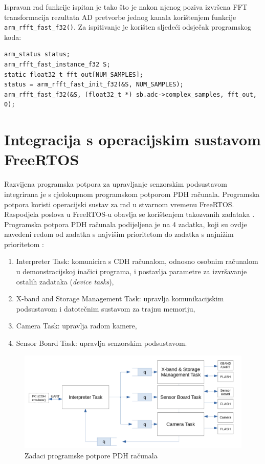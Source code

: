 Ispravan rad funkcije ispitan je tako što je nakon njenog poziva izvršena FFT transformacija rezultata AD pretvorbe jednog kanala korištenjem funkcije \texttt{arm\_rfft\_fast\_f32()}. Za ispitivanje je korišten sljedeći odsječak programskog koda:

\begin{lstlisting}[caption={Program za računanje FFT spektra signala}]
arm_status status;
arm_rfft_fast_instance_f32 S;
static float32_t fft_out[NUM_SAMPLES];
status = arm_rfft_fast_init_f32(&S, NUM_SAMPLES);
arm_rfft_fast_f32(&S, (float32_t *) sb.adc->complex_samples, fft_out, 0);
\end{lstlisting}

\section{Integracija s operacijskim sustavom FreeRTOS}

Razvijena programska potpora za upravljanje senzorskim podsustavom integrirana je s cjelokupnom programskom potporom PDH računala. Programska potpora koristi operacijski sustav za rad u stvarnom vremenu FreeRTOS. Raspodjela poslova u FreeRTOS-u obavlja se korištenjem takozvanih zadataka . Programska potpora PDH računala podijeljena je na 4 zadatka, koji su ovdje navedeni redom od zadatka s najvišim prioritetom do zadatka s najnižim prioritetom \cite{diplomski_goran_petrak}:

\begin{enumerate}
    \item Interpreter Task: komunicira s CDH računalom, odnosno osobnim računalom u demonstracijskoj inačici programa, i postavlja parametre za izvršavanje ostalih zadataka (\textit{device tasks}),
    \item X-band and Storage Management Task: upravlja komunikacijskim podsustavom i datotečnim sustavom za trajnu memoriju,
    \item Camera Task: upravlja radom kamere,
    \item Sensor Board Task: upravlja senzorskim podsustavom.
\end{enumerate}

\begin{figure}[htb]
    \centering
    \includegraphics[width=\textwidth]{slike/rtos_zadaci.png}
    \caption{Zadaci programske potpore PDH računala \cite{diplomski_goran_petrak}}
    \label{fig:rtos_zadaci}
\end{figure}

